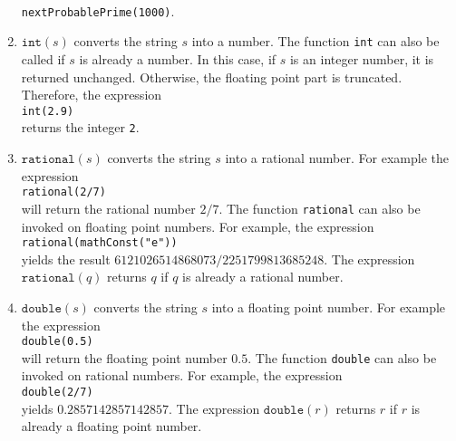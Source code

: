\begin{enumerate}
      \\[0.2cm]
      \hspace*{1.3cm}
      \texttt{nextProbablePrime(1000)}.
\item $\texttt{int}(s)$ converts the string $s$ into a number.
      The function \texttt{int} can also be called if $s$ is already a
      number.  In this case,  if $s$ is an integer number, it is returned unchanged.  Otherwise,
      the floating point part is truncated.  Therefore, the expression
      \\[0.2cm]
      \hspace*{1.3cm}
      \texttt{int(2.9)}
      \\[0.2cm]
      returns the integer \texttt{2}.
\item $\mathtt{rational}(s)$ converts the string $s$ into a rational number.  For example
      the expression
      \\[0.2cm]
      \hspace*{1.3cm}
      \texttt{rational(2/7)}
      \\[0.2cm]
      will return the rational number $2/7$.  The function \texttt{rational} can also be
      invoked on floating point numbers.  For example, the expression 
      \\[0.2cm]
      \hspace*{1.3cm}
      \texttt{rational(mathConst("e"))}
      \\[0.2cm]
      yields the result $6121026514868073/2251799813685248$.  
      The expression $\mathtt{rational}(q)$ returns $q$ if $q$ is already a rational number.
\item $\texttt{double}(s)$ converts the string $s$ into a floating point number.  For example
      the expression
      \\[0.2cm]
      \hspace*{1.3cm}
      \texttt{double(0.5)}
      \\[0.2cm]
      will return the floating point number $0.5$.  The function \texttt{double} can also be
      invoked on rational numbers.  For example, the expression 
      \\[0.2cm]
      \hspace*{1.3cm}
      \texttt{double(2/7)}
      \\[0.2cm]
      yields  $0.2857142857142857$.
      The expression $\mathtt{double}(r)$ returns $r$ if $r$ is already a floating point
      number.


\end{enumerate}
